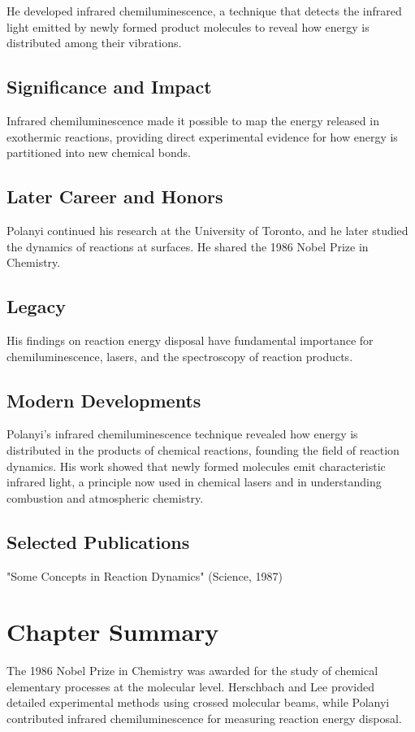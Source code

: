 He developed infrared chemiluminescence, a technique that detects the infrared light emitted by newly formed product molecules to reveal how energy is distributed among their vibrations.

\subsection*{Significance and Impact}

Infrared chemiluminescence made it possible to map the energy released in exothermic reactions, providing direct experimental evidence for how energy is partitioned into new chemical bonds.

\subsection*{Later Career and Honors}

Polanyi continued his research at the University of Toronto, and he later studied the dynamics of reactions at surfaces. He shared the 1986 Nobel Prize in Chemistry.

\subsection*{Legacy}

His findings on reaction energy disposal have fundamental importance for chemiluminescence, lasers, and the spectroscopy of reaction products.

\subsection*{Modern Developments}

Polanyi's infrared chemiluminescence technique revealed how energy is distributed in the products of chemical reactions, founding the field of reaction dynamics. His work showed that newly formed molecules emit characteristic infrared light, a principle now used in chemical lasers and in understanding combustion and atmospheric chemistry.

\subsection*{Selected Publications}

"Some Concepts in Reaction Dynamics" (Science, 1987)

\clearpage

\section*{Chapter Summary}

The 1986 Nobel Prize in Chemistry was awarded for the study of chemical elementary processes at the molecular level. Herschbach and Lee provided detailed experimental methods using crossed molecular beams, while Polanyi contributed infrared chemiluminescence for measuring reaction energy disposal.
